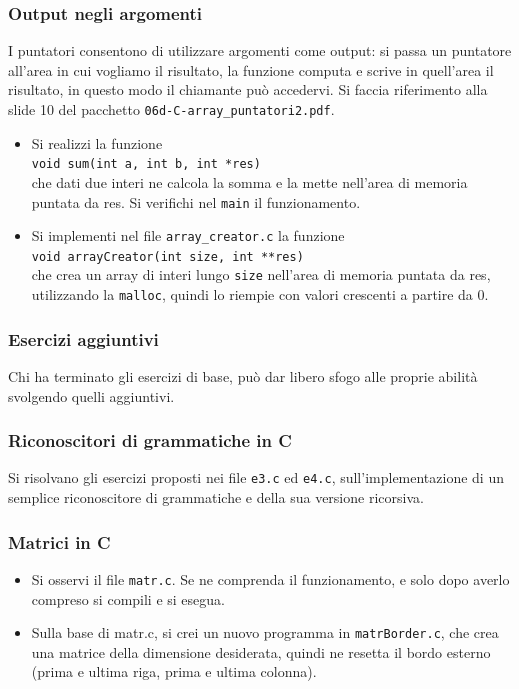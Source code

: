 \documentclass{beamer}
\begin{document}
\begin{frame}
\frametitle{Output negli argomenti}
I puntatori consentono di utilizzare argomenti come output: si passa un puntatore all'area in cui vogliamo il risultato, la funzione computa e scrive in quell'area il risultato, in questo modo il chiamante può accedervi. Si faccia riferimento alla slide 10 del pacchetto \texttt{06d-C-array\_puntatori2.pdf}.
\begin{itemize}
 \item Si realizzi la funzione\\ \texttt{void sum(int a, int b, int *res)} \\che dati due interi ne calcola la somma e la mette nell'area di memoria puntata da res. Si verifichi nel \texttt{main} il funzionamento.
 \item Si implementi nel file \texttt{array\_creator.c} la funzione\\ \texttt{void arrayCreator(int size, int **res)} \\che crea un array di interi lungo \texttt{size} nell'area di memoria puntata da res, utilizzando la \texttt{malloc}, quindi lo riempie con valori crescenti a partire da 0.
\end{itemize}
\end{frame}

\begin{frame}
\frametitle{Esercizi aggiuntivi}
Chi ha terminato gli esercizi di base, può dar libero sfogo alle proprie abilità svolgendo quelli aggiuntivi.
\end{frame}

\begin{frame}
\frametitle{Riconoscitori di grammatiche in C}
Si risolvano gli esercizi proposti nei file \texttt{e3.c} ed \texttt{e4.c}, sull'implementazione di un semplice riconoscitore di grammatiche e della sua versione ricorsiva.
\end{frame}

\begin{frame}
\frametitle{Matrici in C}
\begin{itemize}
 \item Si osservi il file \texttt{matr.c}. Se ne comprenda il funzionamento, e solo dopo averlo compreso si compili e si esegua.
 \item Sulla base di matr.c, si crei un nuovo programma in \texttt{matrBorder.c}, che crea una matrice della dimensione desiderata, quindi ne resetta il bordo esterno (prima e ultima riga, prima e ultima colonna).
\end{itemize}
\end{frame}
\end{document}
